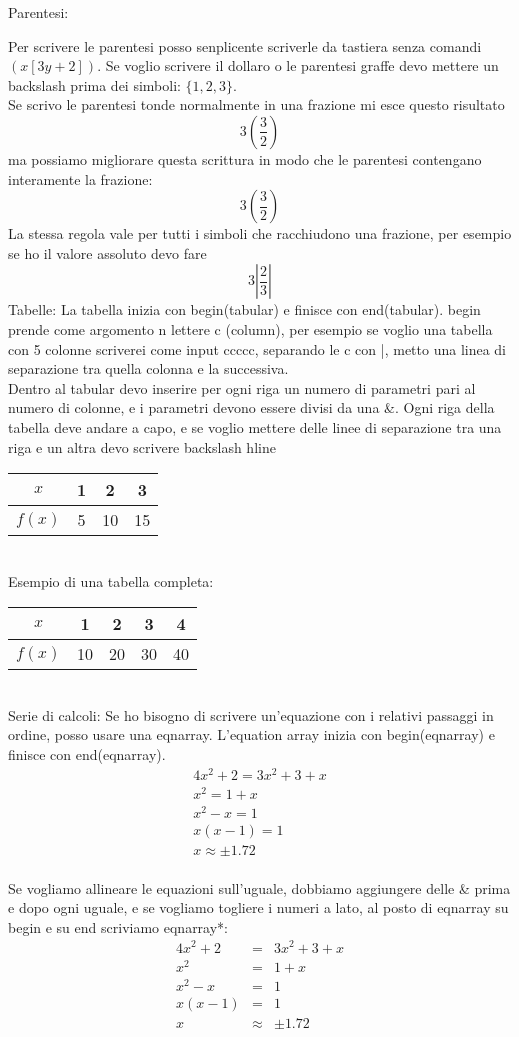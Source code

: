\documentclass[11pt]{article}
\begin{document}
Parentesi:

Per scrivere le parentesi posso senplicente scriverle da tastiera senza comandi $(x[3y + 2])$. Se voglio 
scrivere il dollaro o le parentesi graffe devo mettere un backslash prima dei simboli: $ \{1,2,3\} $.\\
Se scrivo le parentesi tonde normalmente in una frazione mi esce questo risultato 
$$ 3(\frac{3}{2}) $$ ma possiamo migliorare questa scrittura in modo che le parentesi contengano interamente la frazione: $$ 3\left(\frac{3}{2}\right) $$
La stessa regola vale per tutti i simboli che racchiudono una frazione, per esempio se ho il valore assoluto devo fare $$ 3\left|\frac{2}{3}\right| $$
Tabelle: La tabella inizia con begin(tabular){} e finisce con end(tabular). begin prende come argomento n lettere c (column), per esempio 
se voglio una tabella con 5 colonne scriverei come input {ccccc}, separando le c con |, metto una linea di separazione tra quella colonna e la successiva.\\
Dentro al tabular devo inserire per ogni riga un numero di parametri pari al numero di colonne, e i parametri devono essere divisi 
da una \&. Ogni riga della tabella deve andare a capo, e se voglio mettere delle linee di separazione tra una riga e 
un altra devo scrivere backslash hline \\
\begin{tabular}{c|c|cc}
$x$ & 1 & 2 & 3 \\ \hline
$f(x)$ & 5 & 10 & 15 \\
\end{tabular}\\
Esempio di una tabella completa:\\
\begin{tabular}{|c|c|c|c|c|}
    \hline
    $x$ & 1 & 2 & 3 & 4 \\ \hline
    $f(x)$ & 10 & 20 & 30 & 40 \\ \hline
\end{tabular}\\
Serie di calcoli: Se ho bisogno di scrivere un'equazione con i relativi passaggi in ordine, posso usare una
eqnarray. L'equation array inizia con begin(eqnarray) e finisce con end(eqnarray).\\
\begin{eqnarray}
4x^2 + 2 = 3x^2 + 3 + x\\
x^2 = 1 + x\\
x^2 - x = 1\\
x(x-1) = 1\\
x\approx\pm1.72
\end{eqnarray}\\
Se vogliamo allineare le equazioni sull'uguale, dobbiamo aggiungere delle \& prima e dopo ogni uguale, e se 
vogliamo togliere i numeri a lato, al posto di eqnarray su begin e su end scriviamo eqnarray*:\\
\begin{eqnarray*}
    4x^2 + 2 &=& 3x^2 + 3 + x\\
    x^2 &=& 1 + x\\
    x^2 - x &=& 1\\
    x(x-1) &=& 1\\
    x&\approx&\pm1.72
\end{eqnarray*}
\end{document}

